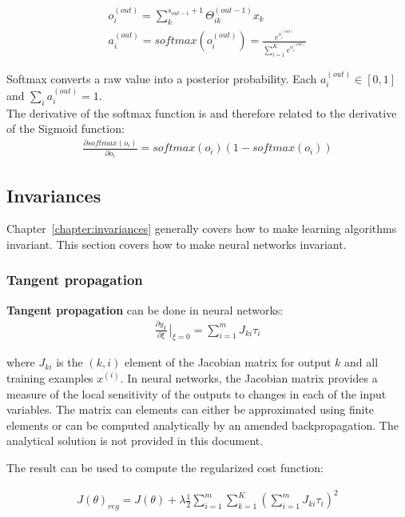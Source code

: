 \documentclass{report}
\begin{document}
\begin{align*}
o_i^{(out)} = \sum_k^{s_{out-1}+1} \Theta_{ik}^{(out-1)}x_k \\
a_i^{(out)} = softmax(o_i^{(out)}) = \frac{e^{o_i^{(out)}}}{\sum_{i=1}^{K} e^{o_i^{(out)}}}
\end{align*}

Softmax converts a raw value into a posterior probability.
Each $a_i^{(out)} \in [0,1]$ and $\sum_i a_i^{(out)} = 1$.\\
The derivative of the softmax function is and therefore related to the derivative of the Sigmoid function:
\begin{align*}
\frac{\partial softmax(o_i)}{\partial o_i} = softmax(o_i)(1-softmax(o_i))
\end{align*}

\subsection{Invariances}
\label{chapter:nninvariances}
Chapter~\ref{chapter:invariances} generally covers how to make learning algorithms invariant. This section covers how to make neural networks invariant.
\\
\subsubsection{Tangent propagation}
{\bf Tangent propagation} can be done in neural networks:
\begin{align*}
\frac{\partial y_k}{\partial \xi}\left.{\!\!\frac{}{}}\right |_{\xi=0} = \sum_{i=1}^{m} J_{ki}\tau_{i}
\end{align*}

where $J_{ki}$ is the $(k,i)$ element of the Jacobian matrix for output $k$ and all training examples $x^{(i)}$.
In neural networks, the Jacobian matrix provides a measure of the local sensitivity of the outputs to changes in each of the input variables.
The matrix can elements can either be approximated using finite elements or can be computed analytically by an amended backpropagation.
The analytical solution is not provided in this document.

The result can be used to compute the regularized cost function:

\begin{align*}
J(\theta)_{reg} = J(\theta) + \lambda \frac{1}{2} \sum_{i=1}^{m} \sum_{k=1}^{K} (\sum_{i=1}^{m} J_{ki}\tau_{i})^2
\end{align*}
\end{document}
